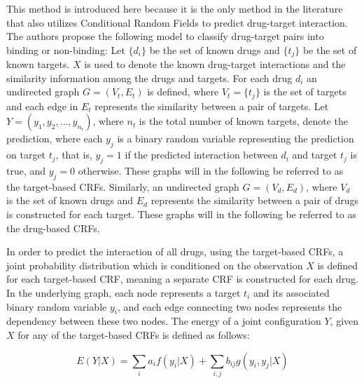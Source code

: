 This method is introduced here because it is the only method in the literature that also utilizes Conditional Random Fields to predict drug-target interaction. The authors propose the following model to classify drug-target pairs into binding or non-binding: Let $\{d_i\}$ be the set of known drugs and $\{t_j\}$ be the set of known targets. $X$ is used to denote the known drug-target interactions and the similarity information among the drugs and targets. For each drug $d_i$ an undirected graph $G=(V_t, E_t)$ is defined, where $V_t=\{t_j\}$ is the set of targets and each edge in $E_t$ represents the similarity between a pair of targets. Let $Y=(y_1, y_2, \dots, y_{n_t})$, where $n_t$ is the total number of known targets, denote the prediction, where each $y_j$ is a binary random variable representing the prediction on target $t_j$, that is, $y_j=1$ if the predicted interaction between $d_i$ and target $t_j$ is true, and $y_j=0$ otherwise. These graphs will in the following be referred to as the target-based CRFs. Similarly, an undirected graph $G=(V_d, E_d)$, where $V_d$ is the set of known drugs and $E_d$ represents the similarity between a pair of drugs is constructed for each target. These graphs will in the following be referred to as the drug-based CRFs. 

In order to predict the interaction of all drugs, using the target-based CRFs, a joint probability distribution which is conditioned on the observation $X$ is defined for each target-based CRF, meaning a separate CRF is constructed for each drug. In the underlying graph, each node represents a target $t_i$ and its associated binary random variable $y_i$, and each edge connecting two nodes represents the dependency between these two nodes. The energy of a joint configuration $Y$, given $X$ for any of the target-based CRFs is defined as follows:

\begin{equation}
E(Y|X) = \sum\limits_{i} a_i f(y_i|X) + \sum\limits_{i,j} b_{ij}g(y_i, y_j | X)
\end{equation}

